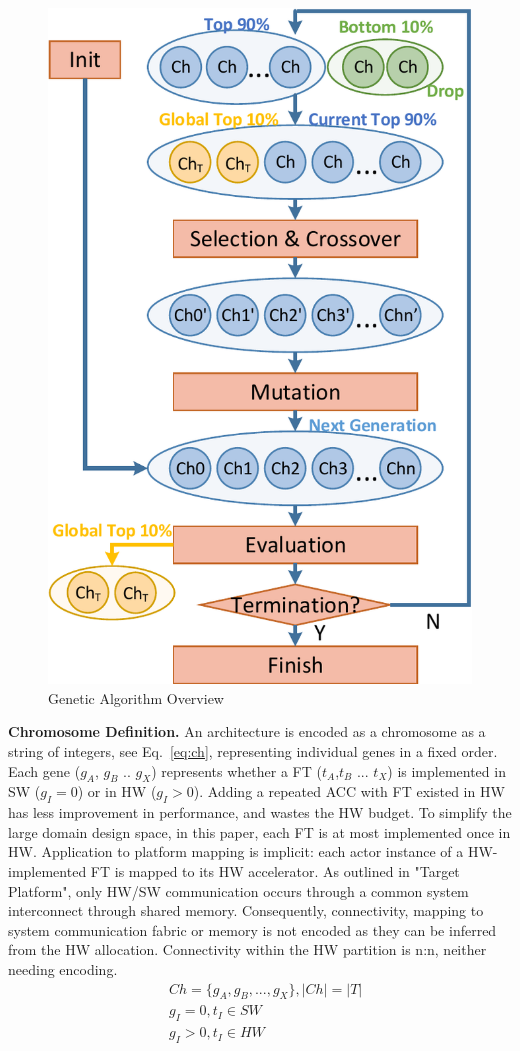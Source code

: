 \begin{figure}[h]
	\centering
	\includegraphics[width=0.6\linewidth]{fig/pGA.pdf}
	\caption{Genetic Algorithm Overview}
	\label{fig:GA}
\end{figure}



\textbf{Chromosome Definition.} An architecture is encoded as a chromosome as a string of integers, see Eq.~\eqref{eq:ch}, representing individual genes in a fixed order. Each gene ($g_A$, $g_B$ .. $g_X$) represents whether a FT ($t_{A}$,$t_{B}$ ... $t_{X}$) is implemented in SW ($g_{I} = 0$) or in HW ($g_{I} > 0$). Adding a repeated ACC with FT existed in HW has less improvement in performance, and wastes the HW budget. To simplify the large domain design space, in this paper, each FT is at most implemented once in HW. Application to platform mapping is implicit: each actor instance of a HW-implemented FT is mapped to its HW accelerator.
As outlined in  "Target Platform", only HW/SW communication occurs through a common system interconnect through shared memory. Consequently, connectivity, mapping to system communication fabric or memory is not encoded as they can be inferred from the HW allocation. Connectivity within the HW partition is n:n, neither needing encoding.
%
\begin{equation}
\begin{split}
\label{eq:ch}
&Ch = \{g_A, g_B, ..., g_X \}, \left\vert{Ch}\right\vert = \left\vert{T}\right\vert \\
&g_{I} = 0, t_{I} \in SW \\
&g_{I} > 0, t_{I} \in HW \\
\end{split}
\end{equation}


